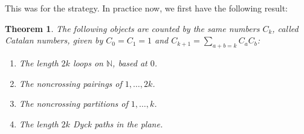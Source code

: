 \documentclass[12pt]{amsbook}
\newtheorem{theorem}{Theorem}[chapter]
\begin{document}
\bigskip

This was for the strategy. In practice now, we first have the following result:

\begin{theorem}
The following objects are counted by the same numbers $C_k$, called Catalan numbers, given by $C_0=C_1=1$ and $C_{k+1}=\sum_{a+b=k}C_aC_b$:
\begin{enumerate}
\item The length $2k$ loops on $\mathbb N$, based at $0$.

\item The noncrossing pairings of $1,\ldots,2k$.

\item The noncrossing partitions of $1,\ldots,k$.

\item The length $2k$ Dyck paths in the plane.
\end{enumerate}
\end{theorem}
\end{document}
